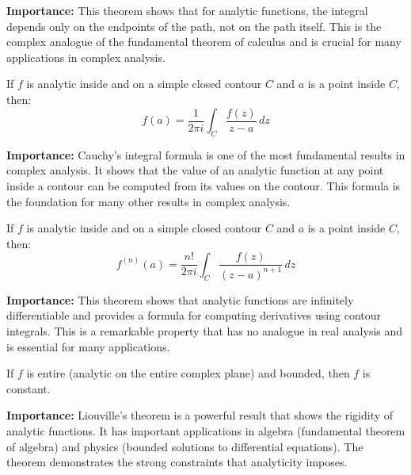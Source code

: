 \noindent\textbf{Importance:} This theorem shows that for analytic functions, the integral depends only on the endpoints of the path, not on the path itself. This is the complex analogue of the fundamental theorem of calculus and is crucial for many applications in complex analysis.



\begin{theorem}
If $f$ is analytic inside and on a simple closed contour $C$ and $a$ is a point inside $C$, then:
\[f(a) = \frac{1}{2\pi i} \int_C \frac{f(z)}{z-a} \, dz\]
\end{theorem}

\noindent\textbf{Importance:} Cauchy's integral formula is one of the most fundamental results in complex analysis. It shows that the value of an analytic function at any point inside a contour can be computed from its values on the contour. This formula is the foundation for many other results in complex analysis.



\begin{theorem}
If $f$ is analytic inside and on a simple closed contour $C$ and $a$ is a point inside $C$, then:
\[f^{(n)}(a) = \frac{n!}{2\pi i} \int_C \frac{f(z)}{(z-a)^{n+1}} \, dz\]
\end{theorem}

\noindent\textbf{Importance:} This theorem shows that analytic functions are infinitely differentiable and provides a formula for computing derivatives using contour integrals. This is a remarkable property that has no analogue in real analysis and is essential for many applications.



\begin{theorem}
If $f$ is entire (analytic on the entire complex plane) and bounded, then $f$ is constant.
\end{theorem}

\noindent\textbf{Importance:} Liouville's theorem is a powerful result that shows the rigidity of analytic functions. It has important applications in algebra (fundamental theorem of algebra) and physics (bounded solutions to differential equations). The theorem demonstrates the strong constraints that analyticity imposes.





